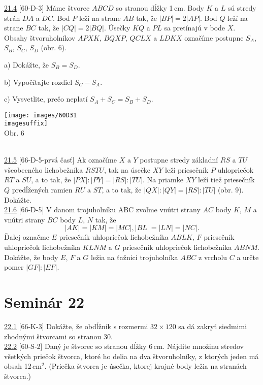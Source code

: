 \noindent \ul{21.4} [60-D-3]  Máme štvorec $ABCD$ so stranou dĺžky 1\,cm. Body $K$ a $L$ sú stredy strán $DA$ a $DC$. Bod $P$ leží na strane $AB$ tak, že $| BP | = 2 | AP |$. Bod $Q$ leží na strane $BC$ tak, že $| CQ | = 2 | BQ |$. Úsečky $KQ$ a $PL$ sa pretínajú v bode $X$. Obsahy štvoruholníkov $APXK$, $BQXP$, $QCLX$ a $LDKX$ označíme postupne $S_A$, $S_B$, $S_C$, $S_D$ (obr. 6).

a) Dokážte, že $S_B = S_D$.

b) Vypočítajte rozdiel $S_C - S_A$.

c) Vysvetlite, prečo neplatí $S_A + S_C = S_B + S_D$.
\begin{center}
\texttt{[image: images/60D31\\imagesuffix]}\\

Obr. 6
\end{center}\\

\noindent \ul{21.5} [66-D-5-prvá časť] Ak označíme $X$ a $Y$ postupne stredy základní $RS$ a $TU$ všeobecného lichobežníka $RSTU$, tak na úsečke $XY$ leží priesečník $P$ uhlopriečok $RT$ a $SU$, a to tak, že $|PX| : |PY | = |RS| : |TU|$. Na priamke $XY$ leží tiež priesečník $Q$ predĺžených ramien $RU$ a $ST$, a to tak, že $|QX| : |QY | = |RS| : |TU|$ (obr. 9). Dokážte.\\

\noindent \ul{21.6} [66-D-5] V danom trojuholníku ABC zvoľme vnútri strany $AC$ body $K$, $M$ a vnútri strany $BC$ body $L$, $N$ tak, že
$$|AK| = |KM| = |MC|, |BL| = |LN| = |NC|.$$
Ďalej označme $E$ priesečník uhlopriečok lichobežníka $ABLK$, $F$ priesečník uhlopriečok lichobežníka $KLNM$ a $G$ priesečník uhlopriečok lichobežníka $ABNM$. Dokážte, že body $E$, $F$ a $G$ ležia na ťažnici trojuholníka $ABC$ z vrcholu $C$ a určte pomer $|GF| : |EF|$.\\

\section*{Seminár 22}

\noindent \ul{22.1} [66-K-3] Dokážte, že obdĺžnik s rozmermi $32 \times 120$ sa dá zakryť siedmimi zhodnými štvorcami so stranou 30.\\

\noindent \ul{22.2} [60-S-2]  Daný je štvorec so stranou dĺžky 6\,cm. Nájdite množinu stredov všetkých priečok štvorca, ktoré ho delia na dva štvoruholníky, z ktorých jeden má obsah 12\,cm$^2$. (Priečka štvorca je úsečka, ktorej krajné body ležia na stranách štvorca.)\\

